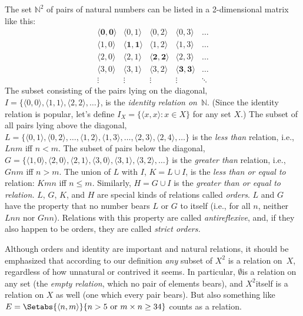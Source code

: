 \documentclass[open-logic-section]{subfiles}
\begin{document}
\begin{ex}
The set $\mathbb{N}^{2}$ of
pairs of natural numbers can be listed in a 2-dimensional matrix like
this:
\[
\begin{array}{ccccc}
\mathbf{\langle 0,0 \rangle} & \langle 0,1 \rangle & 
  \langle 0,2 \rangle & \langle 0,3 \rangle & \ldots\\ 
\langle 1,0 \rangle & \mathbf{\langle 1,1 \rangle} & 
  \langle 1,2 \rangle & \langle 1,3 \rangle & \ldots\\ 
\langle 2,0 \rangle & \langle 2,1 \rangle & 
  \mathbf{\langle 2,2 \rangle} & \langle 2,3 \rangle & \ldots\\ 
\langle 3,0 \rangle & \langle 3,1 \rangle & \langle 3,2 \rangle &
  \mathbf{\langle 3,3 \rangle} & \ldots\\ 
\vdots & \vdots & \vdots & \vdots & \mathbf{\ddots}
\end{array}
\]
The subset consisting of the pairs lying on the diagonal, $I=\{\langle
0,0 \rangle, \langle 1,1 \rangle,\langle 2,2 \rangle,\ldots\}$, is the
\emph{identity relation on}~$\mathbb{N}$. (Since the identity
relation is popular, let's define $I_{X}=\{\langle x,x \rangle:x\in
X\}$ for any set $X$.) The subset of all pairs lying above the
diagonal, $L=\{\langle 0,1 \rangle,\langle 0,2 \rangle,\ldots,\langle
1,2 \rangle,\langle 1,3 \rangle,\ldots,\langle 2,3 \rangle,\langle 2,4
\rangle,\ldots\}$ is the \emph{less than} relation, i.e., $Lnm$ iff
$n<m$. The subset of pairs below the diagonal, $G=\{\langle 1,0
\rangle,\langle 2,0 \rangle,\langle 2,1 \rangle,\langle 3,0
\rangle,\langle 3,1 \rangle,\langle 3,2 \rangle,\ldots\}$ is the
\emph{greater than} relation, i.e., $Gnm$ iff $n>m$. The union of $L$
with $I$, $K=L\cup I$, is the \emph{less than or equal to} relation:
$Kmn$ iff $n\le m$. Similarly, $H=G\cup I$ is the \emph{greater than
  or equal to relation.} $L$, $G$, $K$, and $H$ are special kinds of
relations called \emph{orders}. $L$ and $G$ have the property that no
number bears $L$ or $G$ to itself (i.e., for all $n$, neither $Lnn$
nor $Gnn$). Relations with this property are called
\emph{antireflexive}, and, if they also happen to be orders, they are
called \emph{strict orders.}

Although orders and identity are important and natural relations, it
should be emphasized that according to our definition \emph{any}
subset of $X^{2}$ is a relation on~$X$, regardless of how unnatural or
contrived it seems. In particular, $\emptyset$is a relation on any set
(the \emph{empty relation}, which no pair of elements bears), and
$X^{2}$itself is a relation on $X$ as well (one which every pair
bears). But also something like $E=\Setabs{\langle
  n,m\rangle}{n>5\text{ or }m\times n\ge34}$ counts as a relation.
\end{ex}
\end{document}
